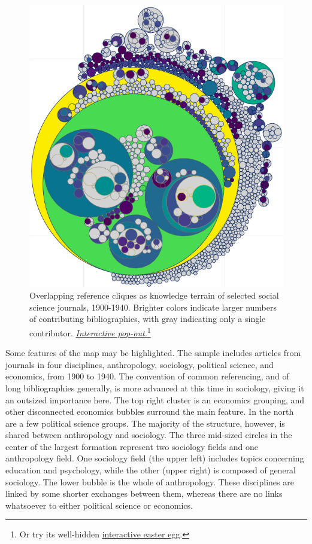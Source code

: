 \documentclass[]{book}
\let\rmarkdownfootnote\footnote%
\def\footnote{\protect\rmarkdownfootnote}
\theoremstyle{definition}
\theoremstyle{definition}
\theoremstyle{definition}
\theoremstyle{remark}
\begin{document}
\begin{figure}

{\centering \includegraphics[width=0.9\linewidth]{img/kcc2tree} 

}

\caption{Overlapping reference cliques as knowledge terrain of
selected social science journals, 1900-1940. Brighter colors indicate
larger numbers of contributing bibliographies, with gray indicating only
a single contributor.
\href{https://brooksambrose.github.io/portfolio/exh/kcc2tree.html}{\emph{Interactive
pop-out.}}\footnote{Or try its well-hidden
  \href{https://brooksambrose.github.io/portfolio/exh/isl3d.html}{interactive
  easter egg}.}}\label{fig:kcc2tree}
\end{figure}

Some features of the map may be highlighted. The sample includes
articles from journals in four disciplines, anthropology, sociology,
political science, and economics, from 1900 to 1940. The convention of
common referencing, and of long bibliographies generally, is more
advanced at this time in sociology, giving it an outsized importance
here. The top right cluster is an economics grouping, and other
disconnected economics bubbles surround the main feature. In the north
are a few political science groups. The majority of the structure,
however, is shared between anthropology and sociology. The three
mid-sized circles in the center of the largest formation represent two
sociology fields and one anthropology field. One sociology field (the
upper left) includes topics concerning education and psychology, while
the other (upper right) is composed of general sociology. The lower
bubble is the whole of anthropology. These disciplines are linked by
some shorter exchanges between them, whereas there are no links
whatsoever to either political science or economics.
\end{document}
